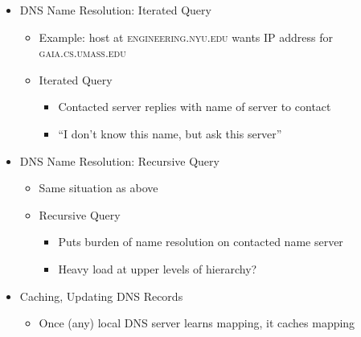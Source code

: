 \begin{itemize}
\begin{itemize}
    \end{itemize}

  \item DNS Name Resolution: Iterated Query

    \begin{itemize}

      \item Example: host at \textsc{engineering.nyu.edu} wants IP address for \textsc{gaia.cs.umass.edu}

      \item Iterated Query

        \begin{itemize}

          \item Contacted server replies with name of server to contact

          \item ``I don't know this name, but ask this server''

        \end{itemize}

    \end{itemize}

  \item DNS Name Resolution: Recursive Query

    \begin{itemize}

      \item Same situation as above

      \item Recursive Query

        \begin{itemize}

          \item Puts burden of name resolution on contacted name server

          \item Heavy load at upper levels of hierarchy?

        \end{itemize}

    \end{itemize}

  \item Caching, Updating DNS Records

    \begin{itemize}

      \item Once (any) local DNS server learns mapping, it caches mapping


\end{itemize}
\end{itemize}
